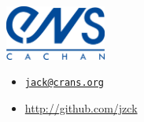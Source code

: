 \begin{minipage}{.25\textwidth}
\includegraphics[width=33mm]{img/ens.jpeg}
\end{minipage}%
\begin{minipage}{.27\textwidth}
\end{minipage}
\begin{minipage}{.48\textwidth}
\begin{itemize}
    \renewcommand\labelitemi{}
    \item \large{\faEnvelope} \textcolor{orange}{\href{mailto:jack@crans.org}{\texttt{jack@crans.org}}}
    \item \large{\faGithub} \textcolor{cyan}{\url{http://github.com/jzck}}
\end{itemize}
\end{minipage}

\vspace{4mm}

